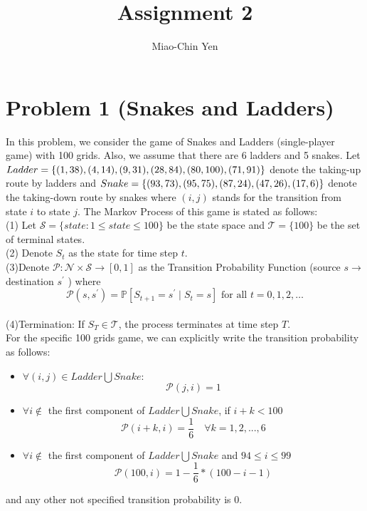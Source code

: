 \documentclass{article}
\title{Assignment 2}
\author{Miao-Chin Yen}
\begin{document}
\maketitle


\section*{Problem 1 (Snakes and Ladders)}
\hspace{1em}In this problem, we consider the game of Snakes and Ladders (single-player game) with 100 grids. Also, we assume that there are 6 ladders and 5 snakes. Let $Ladder=\{(1,38), (4,14), (9,31), (28,84),\\ (80, 100), (71, 91)\}$ denote the taking-up route by ladders and $Snake=\{(93,73), (95,75), (87,24), (47,26),\\ (17, 6)\}$ denote the taking-down route by snakes where $(i,j)$ stands for the transition from state $i$ to state $j$. The Markov Process of this game is stated as follows:\\
\hspace*{1em}(1) Let $\mathcal{S}=\{state: 1\leq state \leq 100 \}$ be the state space and $\mathcal{T}=\{100\}$ be the set of terminal states.\\
\hspace*{1em}(2) Denote $S_{t}$ as the state for time step $t$.\\
\hspace*{1em}(3)Denote $\mathcal{P}: \mathcal{N} \times \mathcal{S} \rightarrow[0,1]$ as the Transition Probability Function (source $s \rightarrow$ destination $s^{\prime}$ ) where
$$
\mathcal{P}\left(s, s^{\prime}\right)=\mathbb{P}\left[S_{t+1}=s^{\prime} \mid S_{t}=s\right] \text { for all } t=0,1,2, \ldots
$$\\
\hspace*{1em}(4)Termination: If $S_{T} \in \mathcal{T}$, the process terminates at time step $T$.\\
For the specific 100 grids game, we can explicitly write the transition probability as follows:\\ 
\begin{itemize}
\item $\forall(i,j)\in Ladder\bigcup Snake$:
$$
\mathcal{P}\left(j, i\right) = 1
$$
\item $\forall i \not\in $ the first component of $Ladder\bigcup Snake$, if $i+k<100$
$$
\mathcal{P}\left(i+k, i\right) = \frac{1}{6}\hspace{1em} \forall k = 1, 2, ..., 6
$$
\item $\forall i \not\in $ the first component of $Ladder\bigcup Snake$ and $94\leq i\leq 99$ 
$$
\mathcal{P}\left(100, i\right) = 1-\frac{1}{6}* (100 -i -1)$$
\end{itemize}
and any other not specified transition probability  is 0.
\end{document}
